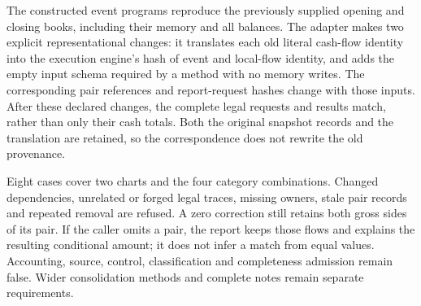 The constructed event programs reproduce the previously supplied opening and
closing books, including their memory and all balances. The adapter makes two
explicit representational changes: it translates each old literal cash-flow
identity into the execution engine's hash of event and local-flow identity,
and adds the empty input schema required by a method with no memory writes.
The corresponding pair references and report-request hashes change with those
inputs. After these declared changes, the complete legal requests and results
match, rather than only their cash totals. Both the original snapshot records
and the translation are retained, so the correspondence does not rewrite the
old provenance.

Eight cases cover two charts and the four category combinations. Changed
dependencies, unrelated or forged legal traces, missing owners, stale pair
records and repeated removal are refused. A zero correction still retains both
gross sides of its pair. If the caller omits a pair, the report keeps those
flows and explains the resulting conditional amount; it does not infer a match
from equal values. Accounting, source, control, classification and completeness
admission remain false. Wider consolidation methods and complete notes remain
separate requirements.
